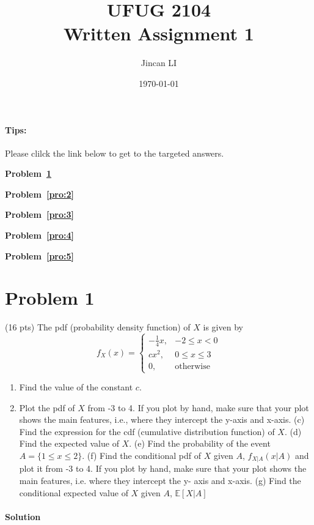 \documentclass[a4paper,10pt]{article}
\begin{document}
\title{UFUG 2104 \\ Written Assignment 1}
\author{Jincan LI}
\date{\today}
\maketitle

\begingroup
\centering
\paragraph{Tips:}
Please clilck the link below to get to the targeted answers.

\textbf{Problem~\ref{pro:1}}

\textbf{Problem~\ref{pro:2}}

\textbf{Problem~\ref{pro:3}}

\textbf{Problem~\ref{pro:4}}

\textbf{Problem~\ref{pro:5}}

\endgroup
\clearpage

\section{Problem 1}\label{pro:1}

(16 pts) The pdf (probability density function) of \(X\) is given by
\[
f_{X}(x) = 
\begin{cases}
-\frac{1}{4}x, & -2 \le x < 0\\
cx^2, & 0 \le x \le 3\\
0, & \text{otherwise}
\end{cases}
\]
\begin{enumerate}[label=(\alph*)]
\item Find the value of the constant $c$.
\item Plot the pdf of $X$ from -3 to 4. If you plot by hand, make sure that your plot shows the
main features, i.e., where they intercept the y-axis and x-axis.
(c) Find the expression for the cdf (cumulative distribution function) of $X$.
(d) Find the expected value of $X$.
(e) Find the probability of the event $A = \{1 \le x \le 2\}$.
(f) Find the conditional pdf of $X$ given $A$, $f_{X|A}(x|A)$ and plot it from -3 to 4. If you plot by
hand, make sure that your plot shows the main features, i.e. where they intercept the y-
axis and x-axis.
(g) Find the conditional expected value of $X$ given $A$, $\mathbb{E}[X|A]$
\end{enumerate}
\paragraph{Solution}
\end{document}
